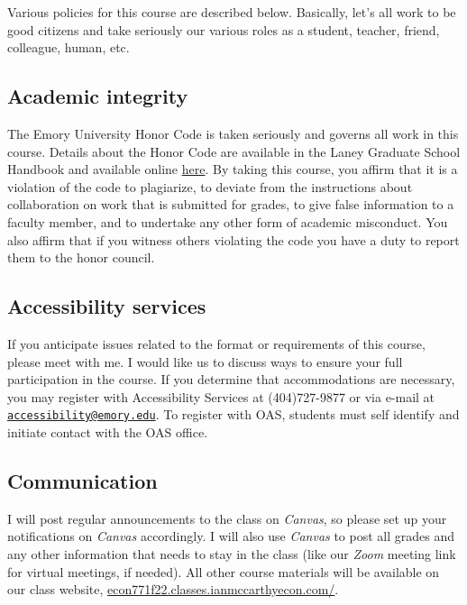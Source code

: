 \documentclass[11pt,]{article}
\begin{document}
Various policies for this course are described below. Basically, let's
all work to be good citizens and take seriously our various roles as a
student, teacher, friend, colleague, human, etc.

\hypertarget{academic-integrity}{%
\subsection{Academic integrity}\label{academic-integrity}}

The Emory University Honor Code is taken seriously and governs all work
in this course. Details about the Honor Code are available in the Laney
Graduate School Handbook and available online
\href{https://www.gs.emory.edu/academics/policies-progress/conduct.html}{here}.
By taking this course, you affirm that it is a violation of the code to
plagiarize, to deviate from the instructions about collaboration on work
that is submitted for grades, to give false information to a faculty
member, and to undertake any other form of academic misconduct. You also
affirm that if you witness others violating the code you have a duty to
report them to the honor council.

\hypertarget{accessibility-services}{%
\subsection{Accessibility services}\label{accessibility-services}}

If you anticipate issues related to the format or requirements of this
course, please meet with me. I would like us to discuss ways to ensure
your full participation in the course. If you determine that
accommodations are necessary, you may register with Accessibility
Services at (404)727-9877 or via e-mail at
\href{mailto:accessibility@emory.edu}{\nolinkurl{accessibility@emory.edu}}.
To register with OAS, students must self identify and initiate contact
with the OAS office.

\hypertarget{communication}{%
\subsection{Communication}\label{communication}}

I will post regular announcements to the class on \emph{Canvas}, so
please set up your notifications on \emph{Canvas} accordingly. I will
also use \emph{Canvas} to post all grades and any other information that
needs to stay in the class (like our \emph{Zoom} meeting link for
virtual meetings, if needed). All other course materials will be
available on our class website,
\href{https://econ771f22.classes.ianmccarthyecon.com/}{econ771f22.classes.ianmccarthyecon.com/}.
\end{document}
